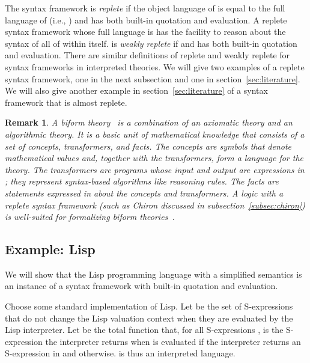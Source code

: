 \documentclass[11pt,fleqn]{article}
\newtheorem{rem}[thm]{Remark}
\begin{document}
\bigskip

The syntax framework  is \emph{replete} if the object language of
 is equal to the full language of  (i.e., ) and
 has both built-in quotation and evaluation.  A replete syntax
framework whose full language is  has the facility to reason about
the syntax of all of  within  itself.   is \emph{weakly
  replete} if  and  has both
built-in quotation and evaluation.  There are similar definitions of
replete and weakly replete for syntax frameworks in interpreted
theories.  We will give two examples of a replete syntax framework,
one in the next subsection and one in section~\ref{sec:literature}.
We will also give another example in section~\ref{sec:literature} of a
syntax framework that is almost replete.

\begin{rem}\em
A \emph{biform
  theory}~\cite{CaretteFarmer08,Farmer07b,FarmerMohrenschildt03} is a
combination of an axiomatic theory and an algorithmic theory.  It is a
basic unit of mathematical knowledge that consists of a set of
\emph{concepts}, \emph{transformers}, and \emph{facts}.  The concepts
are symbols that denote mathematical values and, together with the
transformers, form a language  for the theory.  The transformers
are programs whose input and output are expressions in ; they
represent syntax-based algorithms like reasoning rules.  The facts are
statements expressed in  about the concepts and transformers.  A
logic with a replete syntax framework (such as Chiron discussed in
subsection~\ref{subsec:chiron}) is well-suited for formalizing biform
theories~\cite{Farmer07b}.\hfill 
\end{rem}

\subsection{Example: Lisp} \label{subsec:lisp}

We will show that the Lisp programming language with a simplified
semantics is an instance of a syntax framework with built-in quotation
and evaluation.

Choose some standard implementation of Lisp.  Let  be the set of
S-expressions that do not change the Lisp valuation context when they
are evaluated by the Lisp interpreter.  Let  be the total function that, for all S-expressions ,  is the S-expression the interpreter returns when  is
evaluated if the interpreter returns an S-expression in  and  otherwise.   is thus an
interpreted language.
\end{document}
